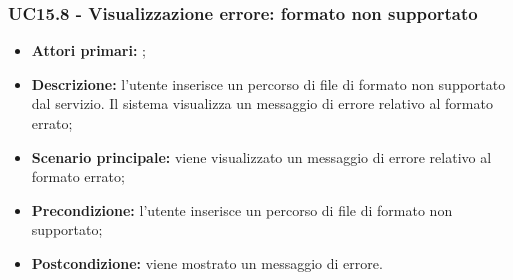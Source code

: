 \subsubsection{UC15.8 - Visualizzazione errore: formato non supportato}
\begin{itemize}
	\item \textbf{Attori primari:} \us{};
	\item \textbf{Descrizione:} l’utente inserisce un percorso di file di formato non supportato dal servizio. Il sistema visualizza un messaggio di errore relativo al formato errato;
	\item \textbf{Scenario principale:} viene visualizzato un messaggio di errore relativo al formato errato;
	\item \textbf{Precondizione:} l'utente inserisce un percorso di file di formato non supportato;
	\item \textbf{Postcondizione:} viene mostrato un messaggio di errore. 
\end{itemize}